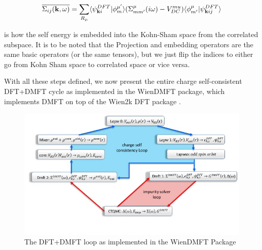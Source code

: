 \documentclass[10pt]{ruthesis}
\begin{document}
\begin{equation}\label{Embedding}
\overline{\Sigma_{ij}(\mathbf{k} ,\omega)}= \sum_{R_\mu} \langle\psi^{DFT}_{\mathbf{k} i}  |\phi^{\mu'}_{m} \rangle (\Sigma^{\mu}_{mm'} (i\omega) -V^{mu}_{DC} )\langle \phi^\mu_{m'}|\psi^{DFT}_{\mathbf{k} ij} \rangle
\end{equation}

is how the self energy is embedded into the Kohn-Sham space from the correlated subspace. It is to be noted that the Projection and embedding operators are the same basic operators (or the same tensors), but we just flip the indices to either go from Kohn Sham space to correlated space or vice versa.
 
With all these steps defined, we now present the entire charge self-consistent DFT+DMFT cycle as implemented in the WienDMFT \cite{PRB_dmft_wien2k_2010_Chuck_Haule} package, which implements DMFT on top of the Wien2k DFT package \cite{wien2k}. 

\begin{figure}\label{DMFT_Loop}
 \includegraphics[width=\columnwidth]{Dmft_loop.jpg}
 \caption{The DFT+DMFT loop as implemented in the WienDMFT Package}
\end{figure}
\end{document}
